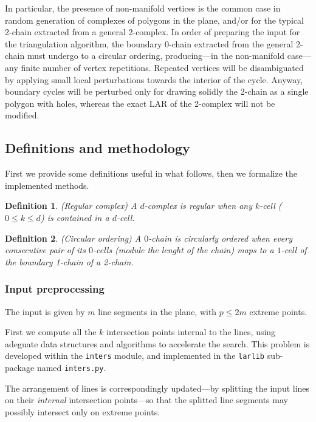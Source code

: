 \documentclass[11pt,oneside]{article}    %
\newtheorem{definition}{Definition}
\begin{document}
In particular, the presence of non-manifold vertices is the common case in random generation of complexes of polygons in the plane, and/or for the typical 2-chain extracted from a general 2-complex. In order of preparing the input for the triangulation algorithm, the boundary 0-chain extracted from the general 2-chain must undergo to a  circular ordering, producing---in the non-manifold case---any finite number of vertex repetitions. Repeated vertices will be disambiguated by applying small local perturbations towards the interior of the cycle. Anyway, boundary cycles will be perturbed only for drawing solidly the 2-chain as a single polygon with holes, whereas the exact LAR of the 2-complex will not be modified.

\subsection{Definitions and methodology}

First we provide some definitions useful in what follows, then we formalize the implemented methods.

\begin{definition}{(Regular complex)}
A $d$-complex is \emph{regular} when any $k$-cell ($0 \leq k \leq d$) is contained in a $d$-cell.
\end{definition}

\begin{definition}{(Circular ordering)}
A $0$-chain is \emph{circularly ordered} when every consecutive pair of its $0$-cells (module the lenght of the chain) maps to a $1$-cell of the boundary 1-chain of a 2-chain.
\end{definition}



\subsubsection{Input preprocessing}

The input is given by $m$ line segments in the plane, with $p\leq 2m$ extreme points.

First we compute all the $k$ intersection points internal to the lines, using adeguate data structures and algorithms to accelerate the search. This problem is developed within the \texttt{inters} module, and implemented in the \texttt{larlib} sub-package named \texttt{inters.py}. 

The arrangement of lines is correspondingly updated---by splitting the input lines on their \emph{internal} intersection points---so that the splitted line segments may possibly intersect only on extreme points.
\end{document}
